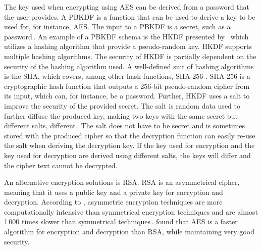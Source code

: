 The key used when encrypting using \gls{AES} can be derived from a password that the user provides. A \gls{PBKDF} is a function that can be used to derive a key to be used for, for instance, \gls{AES}. The input to a \gls{PBKDF} is a secret, such as a password\,\cite{kodwaniSecurityKeyDerivation2021}. An example of a \gls{PBKDF} schema is the \gls{HKDF} presented by \citeauthor{krawczykCryptographicExtractionKey2010}\,\cite{krawczykCryptographicExtractionKey2010, krawczykHMACbasedExtractandExpandKey2010} which utilizes a hashing algorithm that provide a \mbox{pseudo-random} key. \gls{HKDF} supports multiple hashing algorithms. The security of \gls{HKDF} is partially dependent on the security of the hashing algorithm used. A \mbox{well-defined} suit of hashing algorithms is the \gls{SHA}, which covers, among other hash functions, \gls{SHA}-256 \cite{hansenUSSecureHash2011}. \gls{SHA}-256 is a cryptographic hash function that outputs a \mbox{256-bit} \mbox{pseudo-random} cipher from its input, which can, for instance, be a password. Further, \gls{HKDF} uses a salt to improve the security of the provided secret. The salt is random data used to further diffuse the produced key, making two keys with the same secret but different salts, different\,\cite{ariasAddingSaltHashing2021}. The salt does not have to be secret and is sometimes stored with the produced cipher so that the decryption function can easily \mbox{re-use} the salt when deriving the decryption key. If the key used for encryption and the key used for decryption are derived using different salts, the keys will differ and the cipher text cannot be decrypted.

An alternative encryption solutions is \gls{RSA}. \gls{RSA} is an asymmetrical cipher, meaning that it uses a public key and a private key for encryption and decryption. According to \citeauthor{mahajanStudyEncryptionAlgorithms2013}, asymmetric encryption techniques are more computationally intensive than symmetrical encryption techniques and are almost 1\,000 times slower than symmetrical techniques\,\cite{mahajanStudyEncryptionAlgorithms2013}. \citeauthor{mahajanStudyEncryptionAlgorithms2013} found that \gls{AES} is a faster algorithm for encryption and decryption than \gls{RSA}, while maintaining very good security.
